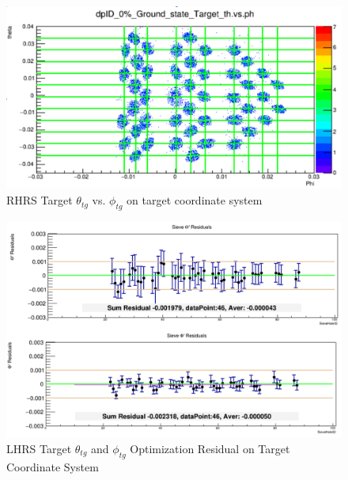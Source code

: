 \begin{figure}[h]
    \centering
    \includegraphics[width =\textwidth]{images/chap4/rhrs_tg_theta_phi_after_opt.png}
    \caption{RHRS Target $\theta_{tg}$ vs. $\phi_{tg}$ on target coordinate system}
    \label{fig:rhrs_tg_theta_phi_postopt}
\end{figure}

\begin{figure}[h]
    \centering
    \includegraphics[width =\textwidth]{images/chap4/lhrs_tg_residual_plot.png}
    \caption{LHRS Target $\theta_{tg}$ and $\phi_{tg}$ Optimization Residual on Target Coordinate System}
    \label{fig:lhrs_tg_theta_phi_residual}
\end{figure}

